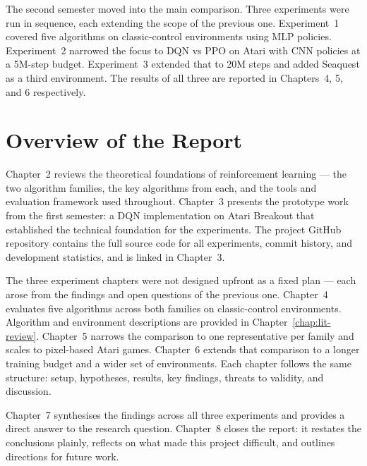 The second semester moved into the main comparison. Three experiments were run in sequence, each extending the scope of the previous one. Experiment~1 covered five algorithms on classic-control environments using MLP policies. Experiment~2 narrowed the focus to DQN vs PPO on Atari with CNN policies at a 5M-step budget. Experiment~3 extended that to 20M steps and added Seaquest as a third environment. The results of all three are reported in Chapters~4, 5, and 6 respectively.


\section{Overview of the Report}

{\color{red} 
Chapter~2 reviews the theoretical foundations of reinforcement learning --- the two algorithm families, the key algorithms from each, and the tools and evaluation framework used throughout. Chapter~3 presents the prototype work from the first semester: a DQN implementation on Atari Breakout that established the technical foundation for the experiments. The project GitHub repository contains the full source code for all experiments, commit history, and development statistics, and is linked in Chapter~3.

The three experiment chapters were not designed upfront as a fixed plan --- each arose from the findings and open questions of the previous one. Chapter~4 evaluates five algorithms across both families on classic-control environments. Algorithm and environment descriptions are provided in Chapter~\ref{chap:lit-review}. Chapter~5 narrows the comparison to one representative per family and scales to pixel-based Atari games. Chapter~6 extends that comparison to a longer training budget and a wider set of environments. Each chapter follows the same structure: setup, hypotheses, results, key findings, threats to validity, and discussion.

Chapter~7 synthesises the findings across all three experiments and provides a direct answer to the research question. Chapter~8 closes the report: it restates the conclusions plainly, reflects on what made this project difficult, and outlines directions for future work.
}






































